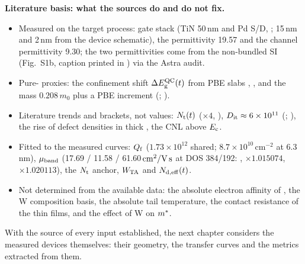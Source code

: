 \begin{keyresult}
\textbf{Literature basis: what the sources do and do not fix.}
\begin{itemize}
\item Measured on the target process: gate stack (TiN 50\,nm and Pd S/D, \citealp[pp.~2--3]{Januar2026};
  \HfO{} 15\,nm and \AlO{} 2\,nm from the device schematic), the \HfO{} permittivity 19.57 and the channel
  permittivity 9.30; the two permittivities come from the non-bundled SI (Fig.~S1b, caption printed in
  \citealp[p.~11]{Januar2026}) via the Astra audit.
\item Pure-\InO{} proxies: the confinement shift $\Delta E_{\mathrm{g}}^{\mathrm{QC}}(t)$ from PBE slabs \citep[p.~21542]{Lin2022},
  \citep[p.~504]{Si2021}, and the mass $0.208\,m_0$ plus a PBE increment
  (\citealp[p.~225102-12]{Stokey2021}; \citealp[p.~21540]{Lin2022}).
\item Literature trends and brackets, not values: $N_{\mathrm{t}}(t)$ ($\times4$, \citealp[p.~7]{Januar2026}),
  $D_{\mathrm{it}} \approx 6\times10^{11}$ (\citealp[p.~21539]{Lin2022}; \citealp[pp.~4--5]{Wang2022}), the rise of
  defect densities in thick \IWO{} \citep[p.~173507-6]{Kim2024}, the CNL above $E_{\mathrm{c}}$.
\item Fitted to the measured curves: $Q_{\mathrm{f}}$ ($1.73\times10^{12}$ shared; $8.7\times10^{10}$\,cm$^{-2}$ at
  6.3\,nm), $\mu_{\mathrm{band}}$ (17.69 / 11.58 / 61.60$\,\mathrm{cm}^{2}/\mathrm{V\,s}$ at DOS 384/192: ,  $\times1.015074$,
   $\times1.020113$), the
  $N_{\mathrm{t}}$ anchor, $W_{\mathrm{TA}}$ and $N_{\mathrm{d,eff}}(t)$.
\item Not determined from the available data: the absolute electron affinity of \IWO, the W
  composition basis, the absolute tail temperature, the contact resistance of the thin films, and
  the effect of W on $m^{*}$.
\end{itemize}
\end{keyresult}

With the source of every input established, the next chapter considers the measured devices
themselves: their geometry, the transfer curves and the metrics extracted from them.
